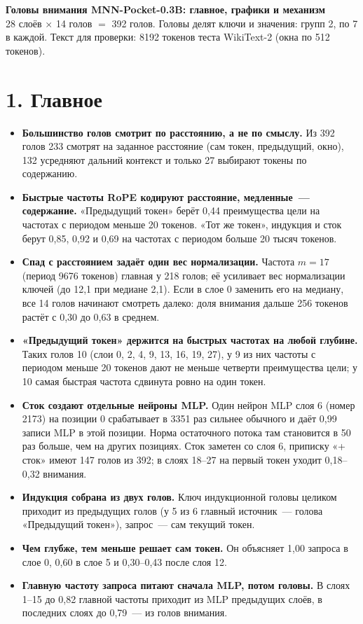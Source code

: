 \documentclass[10pt]{article}
\begin{document}
{\LARGE\bfseries Головы внимания MNN-Pocket-0.3B: главное, графики и механизм}\\[0.2em]
{\color{ink2} 28 слоёв $\times$ 14 голов $=$ 392 голов. Головы делят ключи и значения: групп 2, по 7 в каждой. Текст для проверки: 8192 токенов теста WikiText-2 (окна по 512 токенов).}

\section*{1. Главное}
\begin{itemize}
\item \textbf{Большинство голов смотрит по расстоянию, а не по смыслу.} Из 392 голов 233 смотрят на заданное расстояние (сам токен, предыдущий, окно), 132 усредняют дальний контекст и только 27 выбирают токены по содержанию.
\item \textbf{Быстрые частоты RoPE кодируют расстояние, медленные~— содержание.} «Предыдущий токен» берёт 0,44 преимущества цели на частотах с периодом меньше 20 токенов. «Тот же токен», индукция и сток берут 0,85, 0,92 и 0,69 на частотах с периодом больше 20 тысяч токенов.
\item \textbf{Спад с расстоянием задаёт один вес нормализации.} Частота $m{=}17$ (период 9676 токенов) главная у 218 голов; её усиливает вес нормализации ключей (до 12,1 при медиане 2,1). Если в слое 0 заменить его на медиану, все 14 голов начинают смотреть далеко: доля внимания дальше 256 токенов растёт с 0,30 до 0,63 в среднем.
\item \textbf{«Предыдущий токен» держится на быстрых частотах на любой глубине.} Таких голов 10 (слои 0, 2, 4, 9, 13, 16, 19, 27), у 9 из них частоты с периодом меньше 20 токенов дают не меньше четверти преимущества цели; у 10 самая быстрая частота сдвинута ровно на один токен.
\item \textbf{Сток создают отдельные нейроны MLP.} Один нейрон MLP слоя 6 (номер 2173) на позиции 0 срабатывает в 3351 раз сильнее обычного и даёт 0,99 записи MLP в этой позиции. Норма остаточного потока там становится в 50 раз больше, чем на других позициях. Сток заметен со слоя 6, приписку «+ сток» имеют 147 голов из 392; в слоях 18–27 на первый токен уходит 0,18–0,32 внимания.
\item \textbf{Индукция собрана из двух голов.} Ключ индукционной головы целиком приходит из предыдущих голов (у 5 из 6 главный источник~— голова «Предыдущий токен»), запрос~— сам текущий токен.
\item \textbf{Чем глубже, тем меньше решает сам токен.} Он объясняет 1,00 запроса в слое 0, 0,60 в слое 5 и 0,30–0,43 после слоя 12.
\item \textbf{Главную частоту запроса питают сначала MLP, потом головы.} В слоях 1–15 до 0,82 главной частоты приходит из MLP предыдущих слоёв, в последних слоях до 0,79~— из голов внимания.
\end{itemize}
\end{document}
